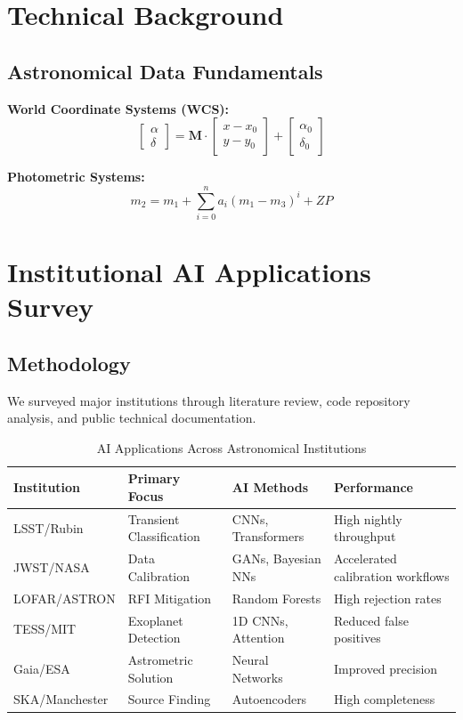 \documentclass[10pt]{article}
\newcommand{\ai}[1]{\textcolor{astrob}{#1}}
\begin{document}
\section{Technical Background}
\label{sec:background}

\subsection{Astronomical Data Fundamentals}
\textbf{World Coordinate Systems (WCS):}
\begin{equation}
\begin{bmatrix}
\alpha \\
\delta
\end{bmatrix} =
\mathbf{M} \cdot
\begin{bmatrix}
x - x_0 \\
y - y_0
\end{bmatrix} +
\begin{bmatrix}
\alpha_0 \\
\delta_0
\end{bmatrix}
\end{equation}

\textbf{Photometric Systems:}
\begin{equation}
m_2 = m_1 + \sum_{i=0}^n a_i (m_1 - m_3)^i + ZP
\end{equation}

\section{Institutional AI Applications Survey}
\label{sec:survey}

\subsection{Methodology}
We surveyed major institutions through literature review, code repository analysis, and public technical documentation.

\begin{table}[H]
\centering
\caption{\ai{AI} Applications Across Astronomical Institutions}
\label{tab:institutional_survey}
\begin{tabular}{l l l l}
\toprule
\textbf{Institution} & \textbf{Primary Focus} & \textbf{AI Methods} & \textbf{Performance} \\
\midrule
LSST/Rubin & Transient Classification & CNNs, Transformers & High nightly throughput \\
JWST/NASA & Data Calibration & GANs, Bayesian NNs & Accelerated calibration workflows \\
LOFAR/ASTRON & RFI Mitigation & Random Forests & High rejection rates \\
TESS/MIT & Exoplanet Detection & 1D CNNs, Attention & Reduced false positives \\
Gaia/ESA & Astrometric Solution & Neural Networks & Improved precision \\
SKA/Manchester & Source Finding & Autoencoders & High completeness \\
\bottomrule
\end{tabular}
\end{table}
\end{document}
